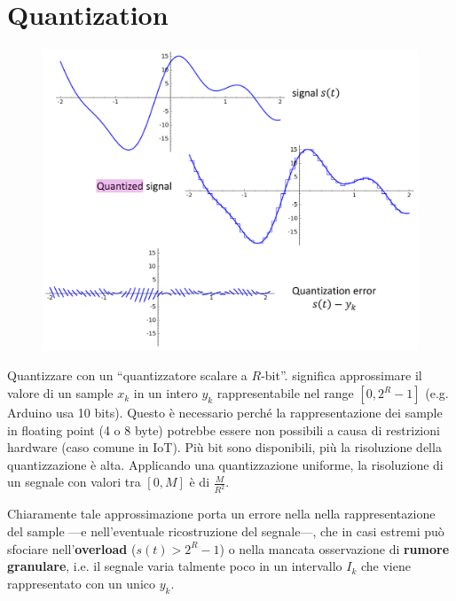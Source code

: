 
\section{Quantization}

\begin{figure}[htbp]
    \centering
    \includegraphics{images/questions/quantization.png}
    \label{fig:quantization}
\end{figure}

Quantizzare con un ``quantizzatore scalare a $R$-bit''. significa approssimare il valore di un sample $x_k$ in un intero $y_k$ rappresentabile nel range $[0,2^R - 1]$ (e.g. Arduino usa 10 bits). Questo è necessario perché la rappresentazione dei sample in floating point (4 o 8 byte) potrebbe essere non possibili a causa di restrizioni hardware (caso comune in IoT). Più bit sono disponibili, più la risoluzione della quantizzazione è alta. Applicando una quantizzazione uniforme, la risoluzione di un segnale con valori tra $[0, M]$ è di $\frac{M}{R^2}$.

Chiaramente tale approssimazione porta un errore nella nella rappresentazione del sample ---e nell'eventuale ricostruzione del segnale---, che in casi estremi può sfociare nell'\textbf{overload} ($s(t) > 2^R - 1$) o nella mancata osservazione di \textbf{rumore granulare}, i.e. il segnale varia talmente poco in un intervallo $I_k$ che viene rappresentato con un unico $y_k$.